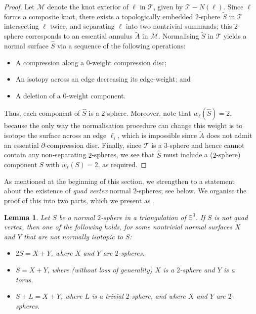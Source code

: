 \documentclass[10pt,a4paper]{amsart}
\newtheorem{lemma}[theorem]{Lemma}
\newcommand{\tri}{\mathcal{T}}
\newcommand{\manifold}{\mathcal{M}}
\begin{document}
\begin{proof}
Let $\manifold$ denote the knot exterior of $\ell$ in $\tri$, given by $\tri-N(\ell)$.
Since $\ell$ forms a composite knot, there exists a topologically embedded $2$-sphere $\tilde{S}$ in $\tri$ intersecting $\ell$ twice, and separating $\ell$ into two nontrivial summands; this $2$-sphere corresponds to an essential annulus $\tilde{A}$ in $\manifold$.
Normalising $\tilde{S}$ in $\tri$ yields a normal surface $\hat{S}$ via a sequence of the following operations:
\begin{itemize}
\item A compression along a $0$-weight compression disc;
\item An isotopy across an edge decreasing its edge-weight; and%
\item A deletion of a $0$-weight component.
\end{itemize}
Thus, each component of $\hat{S}$ is a $2$-sphere. Moreover, note that $w_
\ell(\hat{S})=2$, because the only way the normalisation procedure can change this weight is to isotope the surface across an edge $\ell_i$,
which is impossible since $\tilde{A}$ does not admit an essential $\partial$-compression disc.
Finally, since $\tri$ is a $3$-sphere and hence cannot contain any non-separating $2$-spheres, we see that $\hat{S}$ must include a ($2$-sphere) component $S$ with $w_\ell(S)=2$, as required.
\end{proof}

As mentioned at the beginning of this section, we strengthen  to a statement about the existence of \emph{quad vertex} normal $2$-spheres;
see  below.
We organise the proof of this into two parts, which we present as .

\begin{lemma}\label{lem:x+y}
Let $S$ be a normal $2$-sphere in a triangulation of $\mathbb{S}^3$.
If $S$ is not quad vertex, then one of the following holds, for some nontrivial normal surfaces $X$ and $Y$ that are not normally isotopic to $S$:
\begin{itemize}
\item
$2S = X+Y$, where $X$ and $Y$ are $2$-spheres.
\item
$S = X+Y$, where (without loss of generality) $X$ is a $2$-sphere and $Y$ is a torus.
\item
$S+L = X+Y$, where $L$ is a trivial $2$-sphere, and where $X$ and $Y$ are $2$-spheres.
\end{itemize}
\end{lemma}
\end{document}
